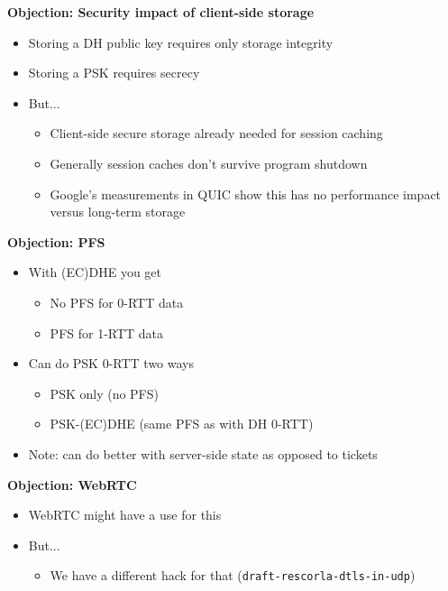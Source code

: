 \documentclass[helvetica]{seminar}
\newcommand{\heading}[1]{%
  \begin{center} 
    \large\bf 
    #1 
  \end{center} 
  \vspace{.4 in}}
\begin{document}
\begin{slide}
\heading{Objection: Security impact of client-side storage}

\begin{itemize}
\item Storing a DH public key requires only storage integrity
\item Storing a PSK requires secrecy
\item But...
  \begin{itemize}
  \item Client-side secure storage already needed for session caching
  \item Generally session caches don't survive program shutdown
  \item Google's measurements in QUIC show this has no performance impact versus long-term storage
  \end{itemize}
\end{itemize}
\end{slide}


\begin{slide}
\heading{Objection: PFS}

\begin{itemize}
\item With (EC)DHE you get
  \begin{itemize}
  \item No PFS for 0-RTT data
  \item PFS for 1-RTT data
  \end{itemize}

\item Can do PSK 0-RTT two ways
  \begin{itemize}
  \item PSK only (no PFS)
  \item PSK-(EC)DHE (same PFS as with DH 0-RTT)
  \end{itemize}

\item Note: can do better with server-side state as opposed to tickets
\end{itemize}

\end{slide}


\begin{slide}
\heading{Objection: WebRTC}

\begin{itemize}
\item WebRTC might have a use for this
\item But...
  \begin{itemize}
  \item We have a different hack for that (\verb^draft-rescorla-dtls-in-udp^)
  \end{itemize}
\end{itemize}

\end{slide}
\end{document}
